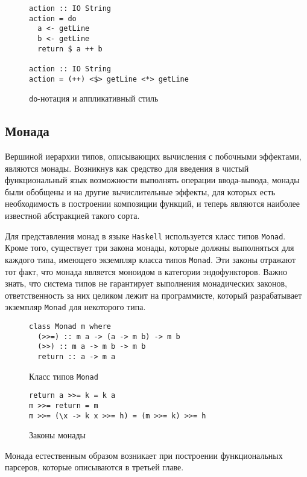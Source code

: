 \begin{figure}
\begin{lstlisting}
action :: IO String
action = do
  a <- getLine
  b <- getLine
  return $ a ++ b

action :: IO String
action = (++) <$> getLine <*> getLine
\end{lstlisting}
\caption{\lstinline{do}-нотация и аппликативный стиль}
\label{listing:MonadApplicative}
\end{figure}

\subsection{Монада}

Вершиной иерархии типов, описывающих вычисления с побочными эффектами, 
являются монады. Возникнув как средство для введения в чистый функциональный 
язык возможности выполнять операции ввода-вывода, монады были обобщены и на 
другие вычислительные эффекты, для которых есть необходимость в построении 
композиции функций, и теперь являются наиболее известной абстракцией такого 
сорта.

Для представления монад в языке \lstinline{Haskell} используется класс типов 
\lstinline{Monad}. Кроме того, существует три закона монады, которые должны 
выполняться для каждого типа, имеющего экземпляр класса типов \lstinline{Monad}.
Эти законы отражают тот факт, что монада является моноидом в категории 
эндофункторов. Важно знать, что система типов не гарантирует выполнения 
монадических законов, ответственность за них целиком лежит на программисте, 
который разрабатывает экземпляр \lstinline{Monad} для некоторого типа.

\begin{figure}[h]
\begin{lstlisting}
class Monad m where
  (>>=) :: m a -> (a -> m b) -> m b
  (>>) :: m a -> m b -> m b
  return :: a -> m a
\end{lstlisting}
\caption{Класс типов \lstinline{Monad}}
\label{listing:Monad}
\end{figure}

\begin{figure}[h]
\begin{lstlisting}
return a >>= k = k a
m >>= return = m
m >>= (\x -> k x >>= h) = (m >>= k) >>= h
\end{lstlisting}
\caption{Законы монады}
\label{listing:MonadLaws}
\end{figure}

Монада естественным образом возникает при построении функциональных парсеров, 
которые описываются в третьей главе.

